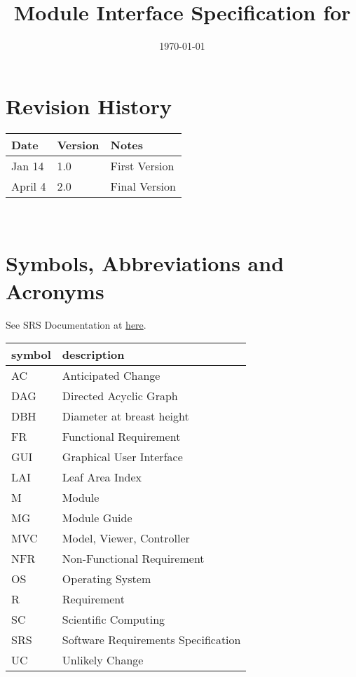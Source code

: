 \documentclass[12pt, titlepage]{article}
\begin{document}
\title{Module Interface Specification for \progname{}}

\author{\authname}

\date{\today}

\maketitle


\section{Revision History}

\begin{tabularx}{\textwidth}{p{3cm}p{2cm}X}
\toprule {\bf Date} & {\bf Version} & {\bf Notes}\\
\midrule
Jan 14 & 1.0 & First Version\\
\hline
April 4 & 2.0 & Final Version\\
\bottomrule
\end{tabularx}

~\newpage

\section{Symbols, Abbreviations and Acronyms}

See SRS Documentation at \href{https://github.com/wuj187/DigitalTwinCAS/blob/main/docs/DocRevision/SRSRevision/SRSRevision.pdf}{here}.
\\

\begin{tabular}{l l} 
  \toprule		
  \textbf{symbol} & \textbf{description}\\
  \midrule 
  AC & Anticipated Change\\
  DAG & Directed Acyclic Graph \\
  DBH & Diameter at breast height\\
  FR & Functional Requirement\\
  GUI & Graphical User Interface\\
  LAI & Leaf Area Index\\
  M & Module \\
  MG & Module Guide \\
  MVC & Model, Viewer, Controller\\
  NFR & Non-Functional Requirement\\
  OS & Operating System \\
  R & Requirement\\
  SC & Scientific Computing \\
  SRS & Software Requirements Specification\\
  UC & Unlikely Change \\
  \bottomrule
\end{tabular}\\
\newpage
\end{document}
